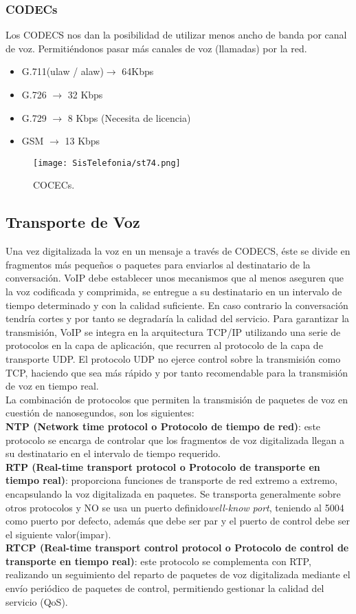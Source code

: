 \documentclass[
	12pt, %
	fleqn, %
	a4paper, %
	oneside, %
]{LegrandOrangeBook}
\begin{document}
\subsubsection{CODECs}
Los CODECS nos dan la posibilidad de utilizar menos ancho de banda por canal de voz. Permitiéndonos pasar más canales de voz (llamadas) por la red.
\begin{itemize}
\item G.711(ulaw / alaw)$\rightarrow$ 64Kbps
\item G.726 $\rightarrow$ 32 Kbps
\item G.729 $\rightarrow$ 8 Kbps (Necesita de licencia)
\item GSM $\rightarrow$ 13 Kbps
\end{itemize}
\begin{figure}[H]
\centering
\texttt{[image: SisTelefonia/st74.png]}
\caption{COCECs.}
\label{fig:tablacodecs}
\end{figure}
\subsection{Transporte de Voz}
Una vez digitalizada la voz en un mensaje a través de CODECS, éste se divide en fragmentos más pequeños o paquetes para enviarlos al destinatario de la conversación. VoIP debe establecer unos mecanismos que al menos aseguren que la voz codificada y comprimida, se entregue a su destinatario en un intervalo de tiempo determinado y con la calidad suficiente. En caso contrario la conversación tendría cortes y por tanto se degradaría la calidad del servicio. Para garantizar la transmisión, VoIP se integra en la arquitectura TCP/IP utilizando una serie de protocolos en la capa de aplicación, que recurren al protocolo de la capa de transporte UDP. El protocolo UDP no ejerce control sobre la transmisión como TCP, haciendo que sea más rápido y por tanto recomendable para la transmisión de voz en tiempo real.\\
La combinación de protocolos que permiten la transmisión de paquetes de voz en cuestión de nanosegundos, son los siguientes:\\
\textbf{NTP (Network time protocol o Protocolo de tiempo de red)}: este protocolo se encarga de controlar que los fragmentos de voz digitalizada llegan a su destinatario en el intervalo de tiempo requerido.\\
\textbf{RTP (Real-time transport protocol o Protocolo de transporte en tiempo real)}: proporciona funciones de transporte de red extremo a extremo, encapsulando la voz digitalizada en paquetes. Se transporta generalmente sobre otros protocolos y NO se usa un puerto definido\textit{well-know port}, teniendo al 5004 como puerto por defecto, además que debe ser par y el puerto de control debe ser el siguiente valor(impar).\\
\textbf{RTCP (Real-time transport control protocol o Protocolo de control de transporte en tiempo real)}: este protocolo se complementa con RTP, realizando un seguimiento del reparto de paquetes de voz digitalizada mediante el envío periódico de paquetes de control, permitiendo gestionar la calidad del servicio (QoS).
\end{document}
